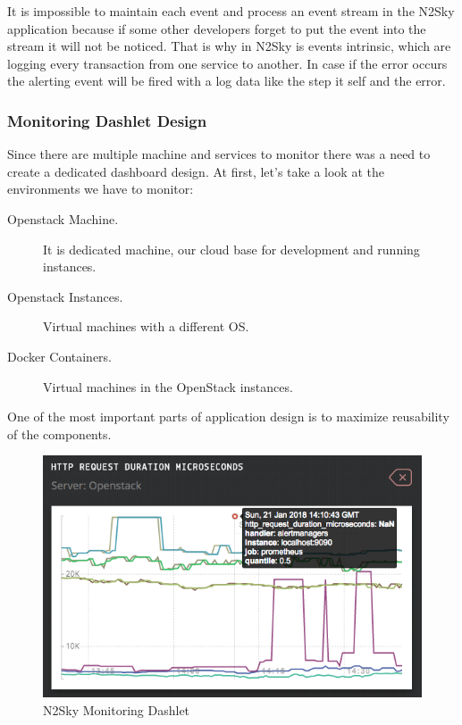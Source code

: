 It is impossible to maintain each event and process an event stream in the N2Sky application because if some other developers forget to put the event into the stream it will not be noticed. That is why in N2Sky is events intrinsic, which are logging every transaction from one service to another. In case if the error occurs the alerting event will be fired with a log data like the step it self and the error. 


\subsubsection{Monitoring Dashlet Design}\label{Monitoring dashlet Design}

Since there are multiple machine and services to monitor there was a need to create a dedicated dashboard design.  At first, let's take a look at the environments we have to monitor: 
\begin{description}
\item[Openstack Machine.]  It is dedicated machine, our cloud base for development and running instances.
\item[Openstack Instances.]   Virtual machines with a different OS.
\item[Docker Containers.]  Virtual machines in the OpenStack instances.
\end{description}

One of the most important parts of application design is to maximize reusability of the components. 

 
\begin{figure}[htbp]
\begin{center}
  \includegraphics[scale=0.65]{components/3/components/monitoring_dashlet.png}
  \caption{N2Sky Monitoring Dashlet}
  \label{fig:monitoring_dashlet}
\end{center}
\end{figure}

